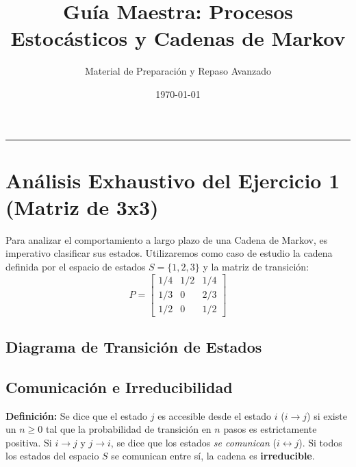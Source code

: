 \documentclass[12pt, a4paper]{article}
\title{\textbf{Guía Maestra: Procesos Estocásticos y Cadenas de Markov}}
\author{Material de Preparación y Repaso Avanzado}
\date{\today}
\begin{document}
\maketitle
\tableofcontents
\vspace{1cm}
\hrule
\vspace{1cm}

\section{Análisis Exhaustivo del Ejercicio 1 (Matriz de 3x3)}
Para analizar el comportamiento a largo plazo de una Cadena de Markov, es imperativo clasificar sus estados. Utilizaremos como caso de estudio la cadena definida por el espacio de estados $S = \{1, 2, 3\}$ y la matriz de transición:
$$ P = \begin{bmatrix} 1/4 & 1/2 & 1/4 \\ 1/3 & 0 & 2/3 \\ 1/2 & 0 & 1/2 \end{bmatrix} $$

\subsection{Diagrama de Transición de Estados}
\begin{center}
\end{center}

\subsection{Comunicación e Irreducibilidad}
\textbf{Definición:} Se dice que el estado $j$ es accesible desde el estado $i$ ($i \to j$) si existe un $n \geq 0$ tal que la probabilidad de transición en $n$ pasos es estrictamente positiva. Si $i \to j$ y $j \to i$, se dice que los estados \textit{se comunican} ($i \leftrightarrow j$). Si todos los estados del espacio $S$ se comunican entre sí, la cadena es \textbf{irreducible}.
\end{document}

